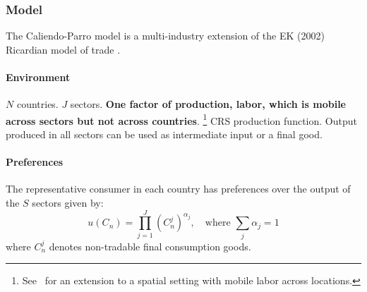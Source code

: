 \subsubsection{Model}
The Caliendo-Parro model is a multi-industry extension of the EK (2002) Ricardian model of trade \citep{Antras:2022}.
\paragraph{Environment}
$N$ countries.
$J$ sectors.
\textbf{One factor of production, labor, which is mobile across sectors but not across countries}.%
\footnote{
    See~\cite{Caliendo:2018} for an extension to a spatial setting with mobile labor across locations.
}
CRS production function.
Output produced in all sectors can be used as intermediate input or a final good.

\paragraph{Preferences}
The representative consumer in each country has preferences over the output of the $S$ sectors given by:
\begin{equation}
    u(C_n) = \prod_{j=1}^J \left(C_n^j \right)^{\alpha_j}, \quad \text{where } \sum_{j} \alpha_j = 1
\end{equation}
where $C_n^j$ denotes non-tradable final consumption goods.

